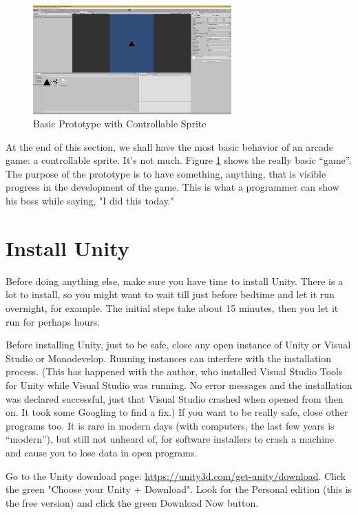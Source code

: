 \documentclass[12pt]{amsbook}
\theoremstyle{definition}
\theoremstyle{remark}
\numberwithin{figure}{chapter}
\numberwithin{table}{chapter}
\numberwithin{section}{chapter}
\numberwithin{equation}{section}
\begin{document}
\begin{figure}[h]
  \includegraphics[width=3in]{prototype.png}
  \caption{Basic Prototype with Controllable Sprite}
  \label{fig:prototype}
\end{figure}


At the end of this section, we shall have the most basic behavior of an arcade game: a controllable sprite.  It’s not much.  Figure \ref{fig:prototype} shows the really basic “game”.  The purpose of the prototype is to have something, anything, that is visible progress in the development of the game.  This is what a programmer can show his boss while saying, "I did this today."


\section{Install Unity}
Before doing anything else, make sure you have time to install Unity.  There is a lot to install, so you might want to wait till just before bedtime and let it run overnight, for example.  The initial steps take about 15 minutes, then you let it run for perhaps hours.

Before installing Unity, just to be safe, close any open instance of Unity or Visual Studio or Monodevelop.  Running instances can interfere with the installation process.  (This has happened with the author, who installed Visual Studio Tools for Unity while Visual Studio was running.  No error messages and the installation was declared successful, just that Visual Studio crashed when opened from then on.  It took some Googling to find a fix.)  If you want to be really safe, close other programs too.  It is rare in modern days (with computers, the last few years is ``modern''), but still not unheard of, for software installers to crash a machine and cause you to lose data in open programs.

Go to the Unity download page: \url{https://unity3d.com/get-unity/download}.  Click the green "Choose your Unity + Download".  Look for the Personal edition (this is the free version) and click the green Download Now button.
\end{document}

